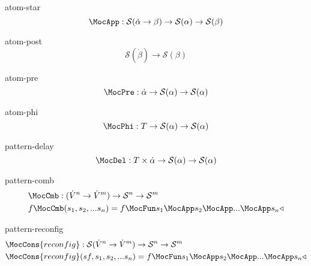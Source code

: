 \documentclass[preview]{standalone}
\begin{document}
\begin{docimage}{atom-star}
  \begin{equation*}%
    \MocApp :
    \mathcal{S}({\dot{\alpha} \rightarrow \beta})
    \rightarrow \mathcal{S}(\alpha) \rightarrow \mathcal{S}(\beta)
  \end{equation*}
\end{docimage}

\begin{docimage}{atom-post}
  \begin{equation*}%
    \mathcal{S}({\dot{\beta}})
    \rightarrow \mathcal{S}(\beta)
  \end{equation*}
\end{docimage}

\begin{docimage}{atom-pre}
  \begin{equation*}%
    \MocPre :
    \dot{\alpha}
    \rightarrow \mathcal{S}(\alpha) \rightarrow \mathcal{S}(\alpha)
  \end{equation*}
\end{docimage}

\begin{docimage}{atom-phi}
  \begin{equation*}%
    \MocPhi :
    T
    \rightarrow \mathcal{S}(\alpha) \rightarrow \mathcal{S}(\alpha)
  \end{equation*}
\end{docimage}


\begin{docimage}{pattern-delay}
  \begin{equation*}%
    \MocDel :
    T \times \dot{\alpha}
    \rightarrow \mathcal{S}(\alpha) \rightarrow \mathcal{S}(\alpha)
  \end{equation*}
\end{docimage}

\begin{docimage}{pattern-comb}
  \begin{align*}%
    &\MocCmb :
      ({\dot{V}^n \rightarrow \dot{V}^m})
      \rightarrow \mathcal{S}^n \rightarrow \mathcal{S}^m \\
    &f \MocCmb (s_1,s_2,...s_n) =
      f \MocFun s_1 \MocApp s_2 \MocApp ... \MocApp s_n \triangleleft
  \end{align*}
\end{docimage}

\begin{docimage}{pattern-reconfig}
  \begin{align*}%
    & \MocCons{reconfig} :
      \mathcal{S}({\dot{V}^n \rightarrow \dot{V}^m})
      \rightarrow \mathcal{S}^n \rightarrow \mathcal{S}^m \\
    & \MocCons{reconfig}(sf,s_1,s_2,...s_n) =
      f \MocFun s_1 \MocApp s_2 \MocApp ... \MocApp s_n \triangleleft
  \end{align*}
\end{docimage}
\end{document}
